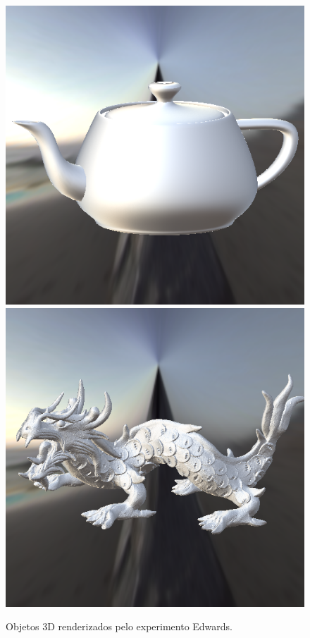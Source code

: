\begin{figure}[H]
    \caption{\small{Objetos 3D renderizados pelo experimento Edwards.}}\label{fig-edwards-2006-eqlang}
  \includegraphics[width=\linewidth]{./Imagens/brdfs/edwards-2006-teapot.png}
\endminipage\hfill
{}
  \includegraphics[width=\linewidth]{./Imagens/brdfs/edwards-2006-dragon.png}

\end{figure}
